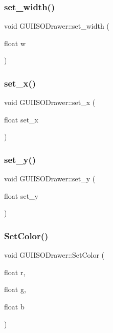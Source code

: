 \subsubsection{\texorpdfstring{set\+\_\+width()}{set\_width()}}
{\footnotesize\ttfamily void G\+U\+I\+I\+S\+O\+Drawer\+::set\+\_\+width (\begin{DoxyParamCaption}\item[{float}]{w }\end{DoxyParamCaption})}

\hypertarget{class_g_u_i_i_s_o_drawer_a8a3288bdaaf3d27157064cdbcf9de1d6}{}\label{class_g_u_i_i_s_o_drawer_a8a3288bdaaf3d27157064cdbcf9de1d6} 
\subsubsection{\texorpdfstring{set\+\_\+x()}{set\_x()}}
{\footnotesize\ttfamily void G\+U\+I\+I\+S\+O\+Drawer\+::set\+\_\+x (\begin{DoxyParamCaption}\item[{float}]{set\+\_\+x }\end{DoxyParamCaption})}

\hypertarget{class_g_u_i_i_s_o_drawer_ab9c7baa15fbd2a640b33589ba723dab8}{}\label{class_g_u_i_i_s_o_drawer_ab9c7baa15fbd2a640b33589ba723dab8} 
\subsubsection{\texorpdfstring{set\+\_\+y()}{set\_y()}}
{\footnotesize\ttfamily void G\+U\+I\+I\+S\+O\+Drawer\+::set\+\_\+y (\begin{DoxyParamCaption}\item[{float}]{set\+\_\+y }\end{DoxyParamCaption})}

\hypertarget{class_g_u_i_i_s_o_drawer_ae54c917e3edaa3c80f1e47d2986cc1ec}{}\label{class_g_u_i_i_s_o_drawer_ae54c917e3edaa3c80f1e47d2986cc1ec} 
\subsubsection{\texorpdfstring{Set\+Color()}{SetColor()}}
{\footnotesize\ttfamily void G\+U\+I\+I\+S\+O\+Drawer\+::\+Set\+Color (\begin{DoxyParamCaption}\item[{float}]{r,  }\item[{float}]{g,  }\item[{float}]{b }\end{DoxyParamCaption})}

